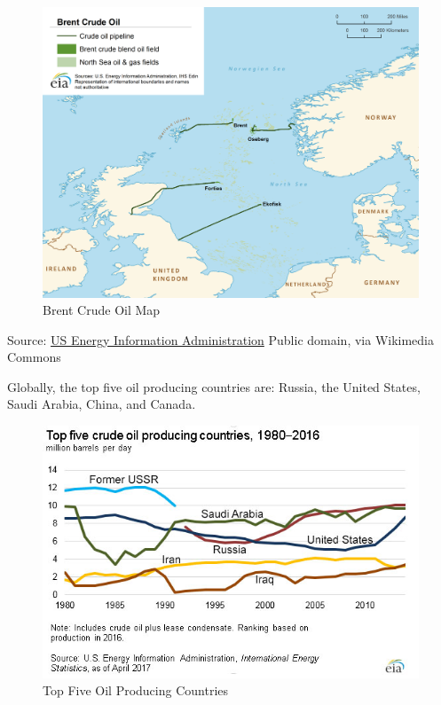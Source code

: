 \documentclass[
  letterpaper,
  DIV=11,
  numbers=noendperiod]{scrreprt}
\begin{document}
\begin{figure}

{\centering \includegraphics{images/Brent_crude_oil_map (1).png}

}

\caption{Brent Crude Oil Map}

\end{figure}

Source: \href{http://www.eia.gov/countries/cab.cfm?fips=UK}{US Energy
Information Administration} Public domain, via Wikimedia Commons

Globally, the top five oil producing countries are: Russia, the United
States, Saudi Arabia, China, and Canada.

\begin{figure}

{\centering \includegraphics{images/top_petroleum_producing_countries-large.jpg}

}

\caption{Top Five Oil Producing Countries}

\end{figure}
\end{document}
